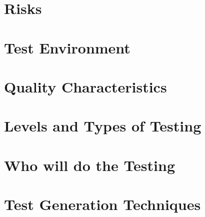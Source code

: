 \documentclass[11pt,a4paper]{article}
\begin{document}
\section{Risks}


\section{Test Environment}


\section{Quality Characteristics}


\section{Levels and Types of Testing}


\section{Who will do the Testing}


\section{Test Generation Techniques}
\end{document}
